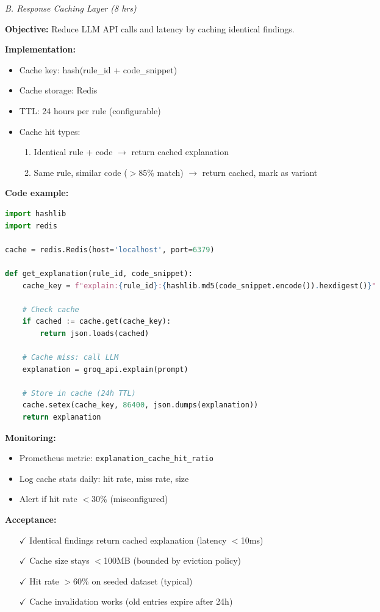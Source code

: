 \documentclass[11pt,a4paper]{article}
\begin{document}
\textit{B. Response Caching Layer (8 hrs)}

\textbf{Objective:} Reduce LLM API calls and latency by caching identical findings.

\textbf{Implementation:}
\begin{itemize}[leftmargin=*]
    \item Cache key: hash(rule\_id + code\_snippet)
    \item Cache storage: Redis
    \item TTL: 24 hours per rule (configurable)
    \item Cache hit types:
    \begin{enumerate}
        \item Identical rule + code $\rightarrow$ return cached explanation
        \item Same rule, similar code ($>$85\% match) $\rightarrow$ return cached, mark as variant
    \end{enumerate}
\end{itemize}

\textbf{Code example:}
\begin{lstlisting}[language=Python]
import hashlib
import redis

cache = redis.Redis(host='localhost', port=6379)

def get_explanation(rule_id, code_snippet):
    cache_key = f"explain:{rule_id}:{hashlib.md5(code_snippet.encode()).hexdigest()}"

    # Check cache
    if cached := cache.get(cache_key):
        return json.loads(cached)

    # Cache miss: call LLM
    explanation = groq_api.explain(prompt)

    # Store in cache (24h TTL)
    cache.setex(cache_key, 86400, json.dumps(explanation))
    return explanation
\end{lstlisting}

\textbf{Monitoring:}
\begin{itemize}[leftmargin=*]
    \item Prometheus metric: \texttt{explanation\_cache\_hit\_ratio}
    \item Log cache stats daily: hit rate, miss rate, size
    \item Alert if hit rate $<$30\% (misconfigured)
\end{itemize}

\textbf{Acceptance:}
\begin{itemize}[leftmargin=*]
    \item[$\checkmark$] Identical findings return cached explanation (latency $<$10ms)
    \item[$\checkmark$] Cache size stays $<$100MB (bounded by eviction policy)
    \item[$\checkmark$] Hit rate $>$60\% on seeded dataset (typical)
    \item[$\checkmark$] Cache invalidation works (old entries expire after 24h)
\end{itemize}
\end{document}
